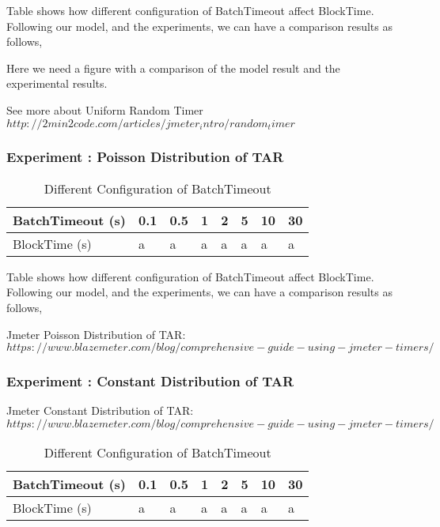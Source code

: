 \documentclass[10pt,journal,compsoc, twoside]{IEEEtran}
\begin{document}
Table shows how different configuration of BatchTimeout affect BlockTime. Following our model, and the experiments, we can have a comparison results as follows,

Here we need a figure with a comparison of the model result and the experimental results.


See more about Uniform Random Timer $http://2min2code.com/articles/jmeter_intro/random_timer$





\subsubsection{Experiment : Poisson Distribution of TAR}

\begin{table}[htbp]
	\caption{Different Configuration of BatchTimeout}
	\begin{tabular}{|l|l|l|l|l|l|l|l|}
		\hline
		BatchTimeout (s) & 0.1 & 0.5 & 1 & 2 & 5 & 10 & 30 \\ \hline
		BlockTime (s)    & a   & a   & a & a & a & a  & a  \\ \hline
	\end{tabular}
\end{table}

Table shows how different configuration of BatchTimeout affect BlockTime. Following our model, and the experiments, we can have a comparison results as follows,

Jmeter Poisson Distribution of TAR: $https://www.blazemeter.com/blog/comprehensive-guide-using-jmeter-timers/$




\subsubsection{Experiment : Constant Distribution of TAR}

Jmeter Constant Distribution of TAR: $https://www.blazemeter.com/blog/comprehensive-guide-using-jmeter-timers/$

\begin{table}[htbp]
	\caption{Different Configuration of BatchTimeout}
	\begin{tabular}{|l|l|l|l|l|l|l|l|}
		\hline
		BatchTimeout (s) & 0.1 & 0.5 & 1 & 2 & 5 & 10 & 30 \\ \hline
		BlockTime (s)    & a   & a   & a & a & a & a  & a  \\ \hline
	\end{tabular}
\end{table}
\end{document}
